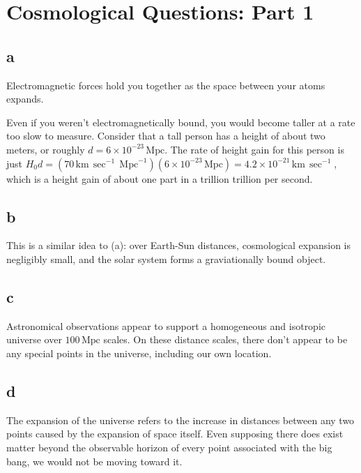 \documentclass[12pt]{article}
\begin{document}
\newcommand{\mpc}{\mathrm{Mpc}}
\newcommand{\km}{\mathrm{km}}
\newcommand{\solarmass}{M_{\odot}}
\newcommand{\s}{\mathrm{sec}}
\newcommand{\is}{\sec^{-1}}
\newcommand{\ikm}{\km^{-1}}
\newcommand{\impc}{\mpc^{-1}}

\newcommand{\reh}{r_\mathrm{eh}}
\newcommand{\rh}{t_\mathrm{h}}
\newcommand{\el}{\epsilon_\Lambda}

\section{Cosmological Questions: Part 1}

\subsection*{a}

Electromagnetic forces hold you together as the space between your atoms expands.

Even if you weren't electromagnetically bound, you would become taller at a rate too slow to measure. Consider that a tall person has a height of about two meters, or roughly \(d = 6 \times 10^{-23} \, \mpc\). The rate of height gain for this person is just \(H_0d = (70 \, \km \, \is \, \impc)(6 \times 10^{-23} \, \mpc) = 4.2 \times 10^{-21} \,\km\,\is\), which is a height gain of about one part in a trillion trillion per second.

\subsection*{b}

This is a similar idea to (a): over Earth-Sun distances, cosmological expansion is negligibly small, and the solar system forms a graviationally bound object.
\subsection*{c}

Astronomical observations appear to support a homogeneous and isotropic universe over \(100 \,\mpc\) scales. On these distance scales, there don't appear to be any special points in the universe, including our own location.

\subsection*{d}

The expansion of the universe refers to the increase in distances between any two points caused by the expansion of space itself. Even supposing there does exist matter beyond the observable horizon of every point associated with the big bang, we would not be moving toward it.
\end{document}

